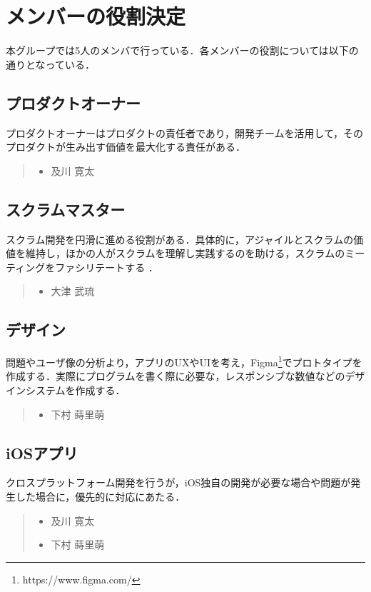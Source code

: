 \section{メンバーの役割決定}
本グループでは5人のメンバで行っている．各メンバーの役割については以下の通りとなっている．

\subsection{プロダクトオーナー}
プロダクトオーナーはプロダクトの責任者であり，開発チームを活用して，そのプロダクトが生み出す価値を最大化する責任がある\cite{scrum}．
\begin{quote}
    \begin{itemize}
        \item 及川 寛太
    \end{itemize}
\end{quote}

\subsection{スクラムマスター}
スクラム開発を円滑に進める役割がある．具体的に，アジャイルとスクラムの価値を維持し，ほかの人がスクラムを理解し実践するのを助ける，スクラムのミーティングをファシリテートする \cite{scrummaster}．
\begin{quote}
    \begin{itemize}
        \item 大津 武琉
    \end{itemize}
\end{quote}

\subsection{デザイン}
問題やユーザ像の分析より，アプリのUXやUIを考え，Figma\footnote{https://www.figma.com/}でプロトタイプを作成する．実際にプログラムを書く際に必要な，レスポンシブな数値などのデザインシステムを作成する．
\begin{quote}
    \begin{itemize}
        \item 下村 蒔里萌
    \end{itemize}
\end{quote}

\subsection{iOSアプリ}
クロスプラットフォーム開発を行うが，iOS独自の開発が必要な場合や問題が発生した場合に，優先的に対応にあたる．
\begin{quote}
    \begin{itemize}
        \item 及川 寛太
        \item 下村 蒔里萌
    \end{itemize}
\end{quote}

